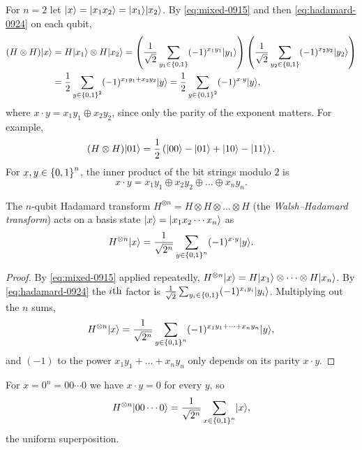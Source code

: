 For $n = 2$ let $\lvert x \rangle = \lvert x_1 x_2 \rangle = \lvert x_1 \rangle\lvert x_2 \rangle$. By \cref{eq:mixed-0915} and then
\cref{eq:hadamard-0924} on each qubit,
\begin{align*}
    (H \otimes H)\lvert x \rangle
     & = H\lvert x_1 \rangle \otimes H\lvert x_2 \rangle
    = \left(\frac{1}{\sqrt{2}} \sum_{y_1 \in \left\lbrace0,1\right\rbrace} (-1)^{x_1 y_1} \lvert y_1 \rangle\right)
    \left(\frac{1}{\sqrt{2}} \sum_{y_2 \in \left\lbrace0,1\right\rbrace} (-1)^{x_2 y_2} \lvert y_2 \rangle\right) \\
     & = \frac{1}{2} \sum_{y \in \left\lbrace0,1\right\rbrace^2} (-1)^{x_1 y_1 + x_2 y_2} \lvert y \rangle
    = \frac{1}{2} \sum_{y \in \left\lbrace0,1\right\rbrace^2} (-1)^{x \cdot y} \lvert y \rangle,
\end{align*}
where $x \cdot y = x_1 y_1 \oplus x_2 y_2$, since only the parity of the exponent matters. For
example,
\[(H \otimes H)\lvert 01 \rangle = \frac{1}{2}\left(\lvert 00 \rangle - \lvert 01 \rangle + \lvert 10 \rangle - \lvert 11 \rangle\right).\]
For $x, y \in \left\lbrace0,1\right\rbrace^n$, the inner product of the bit strings modulo $2$ is
\[x \cdot y = x_1 y_1 \oplus x_2 y_2 \oplus \dots \oplus x_n y_n.\]

\begin{lemma}\label{lem:wh-0924}
    The $n$-qubit Hadamard transform $H^{\otimes n} = H \otimes H \otimes \dots \otimes H$ (the
    \emph{Walsh--Hadamard transform}) acts on a basis state $\lvert x \rangle = \lvert x_1 x_2 \cdots x_n \rangle$ as
    \[H^{\otimes n} \lvert x \rangle = \frac{1}{\sqrt{2^n}} \sum_{y \in \left\lbrace0,1\right\rbrace^n} (-1)^{x \cdot y} \lvert y \rangle.\]
\end{lemma}

\begin{proof}
    By \cref{eq:mixed-0915} applied repeatedly,
    $H^{\otimes n} \lvert x \rangle = H\lvert x_1 \rangle \otimes \dots \otimes H\lvert x_n \rangle$.
    By \cref{eq:hadamard-0924} the $i\text{th}$ factor is
    $\frac{1}{\sqrt{2}} \sum_{y_i \in \left\lbrace0,1\right\rbrace} (-1)^{x_i y_i} \lvert y_i \rangle$. Multiplying out the $n$ sums,
    \[H^{\otimes n} \lvert x \rangle
        = \frac{1}{\sqrt{2^n}} \sum_{y \in \left\lbrace0,1\right\rbrace^n} (-1)^{x_1 y_1 + \dots + x_n y_n} \lvert y \rangle,\]
    and $(-1)$ to the power $x_1 y_1 + \dots + x_n y_n$ only depends on its parity $x \cdot y$.
\end{proof}

For $x = 0^n = 00 \cdots 0$ we have $x \cdot y = 0$ for every $y$, so
\[H^{\otimes n} \lvert 00 \cdots 0 \rangle = \frac{1}{\sqrt{2^n}} \sum_{x \in \left\lbrace0,1\right\rbrace^n} \lvert x \rangle,\]
the uniform superposition.

